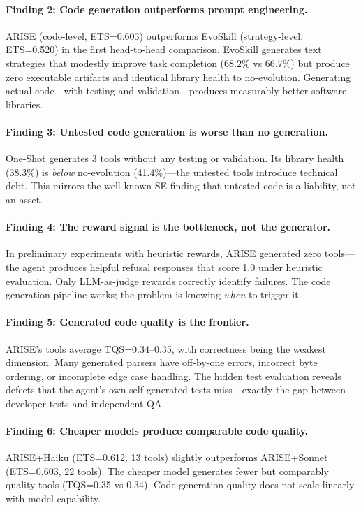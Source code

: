 \documentclass[]{ceurart}
\begin{document}
\paragraph{Finding 2: Code generation outperforms prompt engineering.} ARISE (code-level, ETS=0.603) outperforms EvoSkill (strategy-level, ETS=0.520) in the first head-to-head comparison. EvoSkill generates text strategies that modestly improve task completion (68.2\% vs 66.7\%) but produce zero executable artifacts and identical library health to no-evolution. Generating actual code---with testing and validation---produces measurably better software libraries.

\paragraph{Finding 3: Untested code generation is worse than no generation.} One-Shot generates 3 tools without any testing or validation. Its library health (38.3\%) is \emph{below} no-evolution (41.4\%)---the untested tools introduce technical debt. This mirrors the well-known SE finding that untested code is a liability, not an asset.

\paragraph{Finding 4: The reward signal is the bottleneck, not the generator.} In preliminary experiments with heuristic rewards, ARISE generated zero tools---the agent produces helpful refusal responses that score 1.0 under heuristic evaluation. Only LLM-as-judge rewards correctly identify failures. The code generation pipeline works; the problem is knowing \emph{when} to trigger it.

\paragraph{Finding 5: Generated code quality is the frontier.} ARISE's tools average TQS=0.34--0.35, with correctness being the weakest dimension. Many generated parsers have off-by-one errors, incorrect byte ordering, or incomplete edge case handling. The hidden test evaluation reveals defects that the agent's own self-generated tests miss---exactly the gap between developer tests and independent QA.

\paragraph{Finding 6: Cheaper models produce comparable code quality.} ARISE+Haiku (ETS=0.612, 13 tools) slightly outperforms ARISE+Sonnet (ETS=0.603, 22 tools). The cheaper model generates fewer but comparably quality tools (TQS=0.35 vs 0.34). Code generation quality does not scale linearly with model capability.
\end{document}
